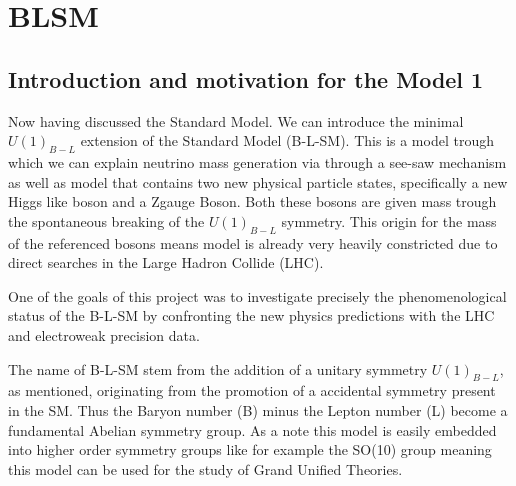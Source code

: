 \chapter{BLSM}
\label{ch:BLSM}

% 
% 
% 

\section{ Introduction and motivation for the Model 1}


Now having discussed the Standard Model. We can introduce the minimal $U(1)_{B-L}$ extension of the Standard Model (B-L-SM). This is a model trough which we can explain neutrino mass generation via through a see-saw mechanism as well as model that contains two new physical particle states, specifically a new Higgs like boson and a Z\textprime gauge Boson. Both these bosons are given mass trough the spontaneous breaking of the $U(1)_{B-L}$ symmetry. This origin for the mass of the referenced bosons means model is already very heavily constricted due to direct searches in the  Large Hadron Collide (LHC). 

One of the goals of this project was to investigate precisely the phenomenological status of the B-L-SM by confronting the new physics predictions with the LHC and electroweak precision data.   

%
% 

The name of B-L-SM stem from the addition of a unitary symmetry $U(1)_{B-L}$, as mentioned, originating from the promotion of a accidental symmetry present in the SM. Thus the Baryon number (B) minus the Lepton number (L) become a fundamental Abelian symmetry group. As a note this model is easily embedded into higher order symmetry groups like for example the SO(10) group meaning this model can be used for the study of Grand Unified Theories.  

